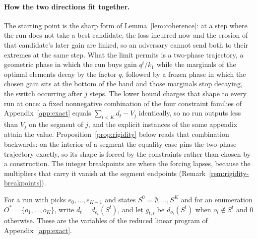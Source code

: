 \paragraph{How the two directions fit together.}
The starting point is the sharp form of Lemma~\ref{lem:coherence}: at a step
where the run does not take a best candidate, the loss incurred now and the
erosion of that candidate's later gain are linked, so an adversary cannot send
both to their extremes at the same step.  What the limit permits is a
two-phase trajectory, a geometric phase in which the run buys gain $q^{t}/k_1$
while the marginals of the optimal elements decay by the factor $q$, followed
by a frozen phase in which the chosen gain sits at the bottom of the band and
those marginals stop decaying, the switch occurring after $j$ steps.  The
lower bound charges that shape to every run at once: a fixed nonnegative
combination of the four constraint families of Appendix~\ref{app:exact} equals
$\sum_{t<K}d_t-V_j$ identically, so no run outputs less than $V_j$ on the
segment of $j$, and the explicit instances of the same appendix attain the
value.  Proposition~\ref{prop:rigidity} below reads that combination
backwards: on the interior of a segment the equality case pins the two-phase
trajectory exactly, so its shape is forced by the constraints rather than
chosen by a construction.  The integer breakpoints are where the forcing
lapses, because the multipliers that carry it vanish at the segment endpoints
(Remark~\ref{rem:rigidity-breakpoints}).

For a run with picks $e_0,\dots,e_{K-1}$ and states
$S^{0}=\emptyset,\dots,S^{K}$ and for an enumeration
$O^{\ast}=\{o_1,\dots,o_K\}$, write $d_t=d_{e_t}(S^{t})$, and let $g_{t,i}$ be
$d_{o_i}(S^{t})$ when $o_i\notin S^{t}$ and $0$ otherwise.  These are the
variables of the reduced linear program of Appendix~\ref{app:exact}.

